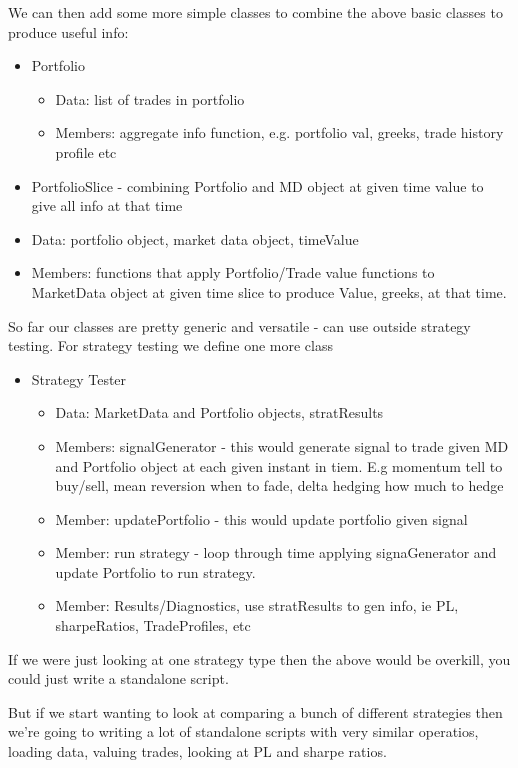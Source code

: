 \documentclass{article}\usepackage{graphicx, color}
\begin{document}
We can then add some more simple classes to combine the above basic classes to produce useful info:
\begin{itemize}
  \item Portfolio
    \begin{itemize}
      \item Data: list of trades in portfolio
      \item Members: aggregate info function, e.g. portfolio val, greeks, trade history profile etc
    \end{itemize}
  \item PortfolioSlice - combining Portfolio and MD object at given time value to give all info at that time
    \item Data: portfolio object, market data object, timeValue
    \item Members: functions that apply Portfolio/Trade value functions to MarketData object at given time slice to produce Value, greeks, at that time.
\end{itemize}

So far our classes are pretty generic and versatile - can use outside strategy testing. For strategy testing we define one more class


\begin{itemize}
  \item Strategy Tester
    \begin{itemize}
      \item Data: MarketData and Portfolio objects, stratResults
      \item Members: signalGenerator - this would generate signal to trade given MD and Portfolio object at each given instant in tiem. E.g momentum tell to buy/sell, mean reversion when to fade, delta hedging how much to hedge 
      \item Member: updatePortfolio - this would update portfolio given signal
      \item Member: run strategy - loop through time applying signaGenerator and update Portfolio to run strategy.
      \item Member: Results/Diagnostics, use stratResults to gen info, ie PL, sharpeRatios, TradeProfiles, etc
    \end{itemize}
\end{itemize}

If we were just looking at one strategy type then the above would be overkill, you could just write a standalone script. 

But if we start wanting to look at comparing a bunch of different strategies then we're going to writing a lot of standalone scripts with very similar operatios, loading data, valuing trades, looking at PL and sharpe ratios. 
\end{document}
